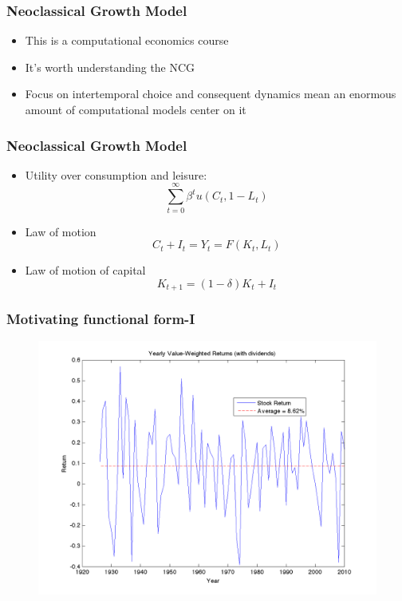 \documentclass{beamer}
\begin{document}
\begin{frame}
\frametitle[alignment=center]{Neoclassical Growth Model}
\begin{itemize}
\item This is a computational economics course
\bigskip
\item It's worth understanding the NCG
\bigskip
\item Focus on intertemporal choice and consequent dynamics mean an enormous amount of computational models center on it
\end{itemize}
\end{frame}

\begin{frame}
\frametitle[alignment=center]{Neoclassical Growth Model}
\begin{itemize}
\item Utility over consumption and leisure:
$$\sum_{t=0}^\infty \beta^tu(C_t,1-L_t)$$
\item Law of motion
$$C_t+I_t=Y_t=F(K_t,L_t)$$
\item Law of motion of capital
$$K_{t+1}=(1-\delta)K_t+I_t$$
\end{itemize}
\end{frame}

\begin{frame}
\frametitle[alignment=center]{Motivating functional form-I}
\begin{figure}
\centering
\includegraphics[scale=0.2]{Figures/AnnualReturns}
\end{figure}
\end{frame}
\end{document}
